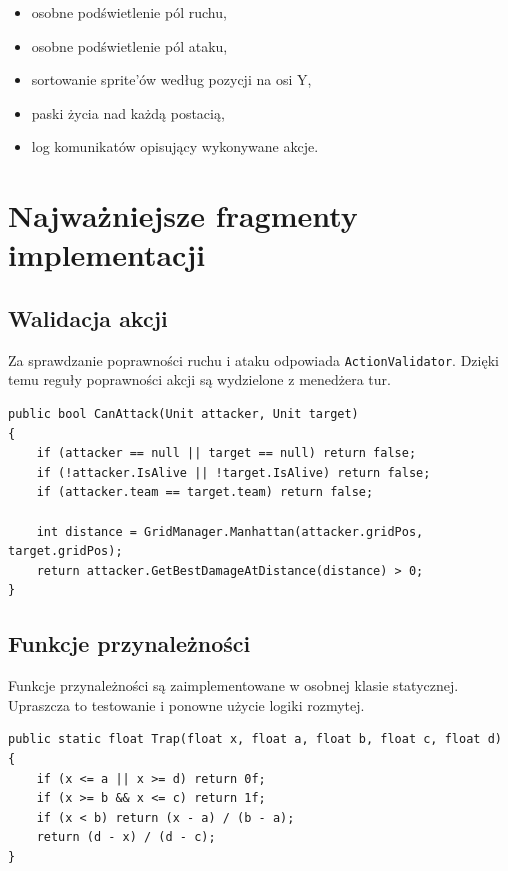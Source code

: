 \documentclass[12pt,a4paper]{article}
\begin{document}
\begin{itemize}
    \item osobne podświetlenie pól ruchu,
    \item osobne podświetlenie pól ataku,
    \item sortowanie sprite'ów według pozycji na osi Y,
    \item paski życia nad każdą postacią,
    \item log komunikatów opisujący wykonywane akcje.
\end{itemize}

\newpage

\section{Najważniejsze fragmenty implementacji}

\subsection{Walidacja akcji}

Za sprawdzanie poprawności ruchu i ataku odpowiada \texttt{ActionValidator}. Dzięki temu reguły poprawności akcji są wydzielone z menedżera tur.

\begin{lstlisting}[language={[Sharp]C}, caption={Przykładowa logika walidacji ataku}]
public bool CanAttack(Unit attacker, Unit target)
{
    if (attacker == null || target == null) return false;
    if (!attacker.IsAlive || !target.IsAlive) return false;
    if (attacker.team == target.team) return false;

    int distance = GridManager.Manhattan(attacker.gridPos, target.gridPos);
    return attacker.GetBestDamageAtDistance(distance) > 0;
}
\end{lstlisting}

\subsection{Funkcje przynależności}

Funkcje przynależności są zaimplementowane w osobnej klasie statycznej. Upraszcza to testowanie i ponowne użycie logiki rozmytej.

\begin{lstlisting}[language={[Sharp]C}, caption={Trapezoidalna funkcja przynależności}]
public static float Trap(float x, float a, float b, float c, float d)
{
    if (x <= a || x >= d) return 0f;
    if (x >= b && x <= c) return 1f;
    if (x < b) return (x - a) / (b - a);
    return (d - x) / (d - c);
}
\end{lstlisting}
\end{document}
